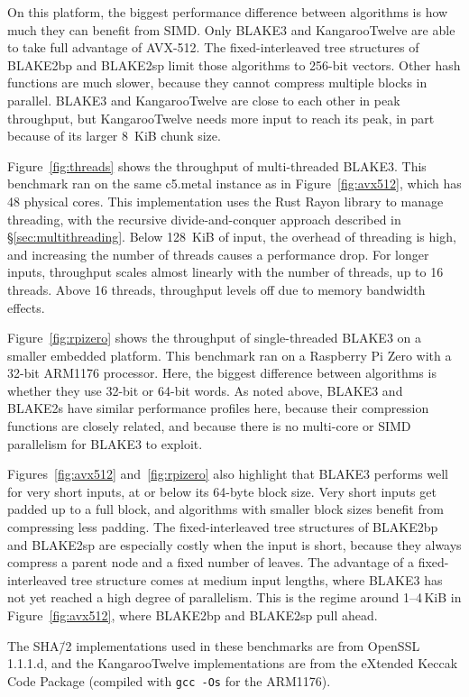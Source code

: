 \documentclass[11pt,notitlepage,a4paper]{article}
\begin{document}
On this platform, the biggest performance difference between algorithms is how
much they can benefit from SIMD. Only BLAKE3 and KangarooTwelve are able to
take full advantage of AVX-512. The fixed-interleaved tree structures of
BLAKE2bp and BLAKE2sp limit those algorithms to 256-bit vectors. Other hash
functions are much slower, because they cannot compress multiple blocks in
parallel. BLAKE3 and KangarooTwelve are close to each other in peak throughput, but
KangarooTwelve needs more input to reach its peak, in part because of its
larger 8~KiB chunk size.

Figure~\ref{fig:threads} shows the throughput of multi-threaded BLAKE3. This
benchmark ran on the same c5.metal instance as in Figure~\ref{fig:avx512},
which has 48 physical cores. This implementation uses the Rust Rayon library to
manage threading, with the recursive divide-and-conquer approach described in
\S\ref{sec:multithreading}. Below 128~KiB of input, the overhead of threading
is high, and increasing the number of threads causes a performance drop. For
longer inputs, throughput scales almost linearly with the number of threads, up
to 16 threads. Above 16 threads, throughput levels off due to memory bandwidth
effects.

Figure~\ref{fig:rpizero} shows the throughput of single-threaded BLAKE3 on a
smaller embedded platform. This benchmark ran on a Raspberry Pi Zero with a
32-bit ARM1176 processor. Here, the biggest difference between algorithms is
whether they use 32-bit or 64-bit words. As noted above, BLAKE3 and BLAKE2s
have similar performance profiles here, because their compression functions are
closely related, and because there is no multi-core or SIMD parallelism for
BLAKE3 to exploit.

Figures~\ref{fig:avx512} and~\ref{fig:rpizero} also highlight that BLAKE3
performs well for very short inputs, at or below its 64-byte block size. Very
short inputs get padded up to a full block, and algorithms with smaller block
sizes benefit from compressing less padding. The fixed-interleaved tree
structures of BLAKE2bp and BLAKE2sp are especially costly when the input is
short, because they always compress a parent node and a fixed number of leaves.
The advantage of a fixed-interleaved tree structure comes at medium input
lengths, where BLAKE3 has not yet reached a high degree of parallelism.
This is the regime around 1--4\,KiB in Figure~\ref{fig:avx512}, where BLAKE2bp
and BLAKE2sp pull ahead.

The SHA\=/2 implementations used in these benchmarks are from OpenSSL 1.1.1.d,
and the KangarooTwelve implementations are from the eXtended Keccak Code
Package (compiled with \texttt{gcc -Os} for the ARM1176).
\end{document}
